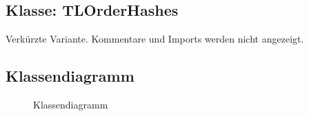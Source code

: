\subsection{Klasse: TLOrderHashes}
\label{app:OrderHashes}
Verkürzte Variante. Kommentare und Imports werden nicht angezeigt.

\clearpage

\subsection{Klassendiagramm}
\label{app:Klassendiagramm}
\begin{figure}[htb]
\centering
{}
\caption{Klassendiagramm}
\end{figure}
\clearpage


